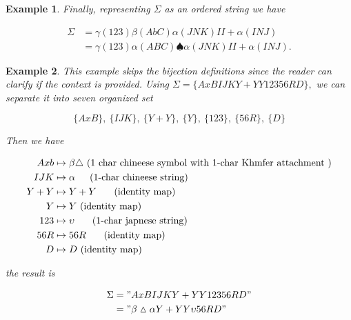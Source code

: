 \documentclass[amsmath,12pt,a4paper]{amsart}
\newtheorem{example}{Example}
\begin{document}
\begin{example}
Finally, representing $\Sigma$ as an ordered string we have

\begin{equation}\label{Eq23}
\begin{split}
\Sigma  & = \gamma(123)\beta(AbC)\alpha(JNK)II+\alpha(INJ) \\
& = \gamma(123)\alpha(ABC)\spadesuit \alpha(JNK)II+\alpha(INJ).
\end{split}
\end{equation}

 \end{example}
 
 \begin{example}\label{Ex3}
This example skips the bijection definitions since the reader can clarify if the context is provided. Using $
\Sigma = \{A x B IJK Y + Y Y 12356RD\},
$ we can separate it into seven organized set


\begin{equation}\label{Eq24}
\{AxB\},~\{IJK\}, ~\{Y+Y\}, ~\{Y\},~\{123\}, ~\{56R\},~\{D\}
\end{equation}

Then we have

\begin{equation}\label{Eq25}
\begin{split}
Axb & \mapsto \beta\triangle~(\text{1 char chineese symbol with 1-char Khmfer attachment })\\
IJK & \mapsto \alpha \indent (\text{1-char chineese string})\\
Y+Y & \mapsto Y+Y~ \indent (\text{identity map})\\
Y& \mapsto Y ~\text{(identity map)}\\
123& \mapsto \upsilon ~\indent (\text{1-char japnese string})\\
56R & \mapsto 56R ~\indent (\text{identity  map})\\
D & \mapsto D~ (\text{identity map})
\end{split}
\end{equation}

the result is

\begin{equation}\label{Eq26}
\begin{split}
\Sigma &= "AxBIJKY+YY12356RD"\\
 & = "\beta\vartriangle \alpha Y+YY\upsilon56RD "\\
\end{split}
\end{equation}
 \end{example}
 
\end{document}
